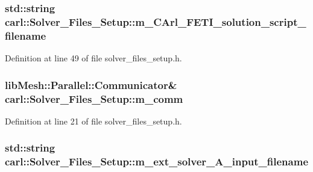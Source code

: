 \subsubsection[{m\+\_\+\+C\+Arl\+\_\+\+F\+E\+T\+I\+\_\+solution\+\_\+script\+\_\+filename}]{\setlength{\rightskip}{0pt plus 5cm}std\+::string carl\+::\+Solver\+\_\+\+Files\+\_\+\+Setup\+::m\+\_\+\+C\+Arl\+\_\+\+F\+E\+T\+I\+\_\+solution\+\_\+script\+\_\+filename\hspace{0.3cm}{\ttfamily [protected]}}\label{classcarl_1_1_solver___files___setup_a147113a3a6de5fa59e4236adf08e16b2}


Definition at line 49 of file solver\+\_\+files\+\_\+setup.\+h.

\hypertarget{classcarl_1_1_solver___files___setup_aa8049195d5e383a0ca4295795e3f5751}{}
\subsubsection[{m\+\_\+comm}]{\setlength{\rightskip}{0pt plus 5cm}lib\+Mesh\+::\+Parallel\+::\+Communicator\& carl\+::\+Solver\+\_\+\+Files\+\_\+\+Setup\+::m\+\_\+comm\hspace{0.3cm}{\ttfamily [protected]}}\label{classcarl_1_1_solver___files___setup_aa8049195d5e383a0ca4295795e3f5751}


Definition at line 21 of file solver\+\_\+files\+\_\+setup.\+h.

\hypertarget{classcarl_1_1_solver___files___setup_ae236e05ce11d2249f91f5a52906149a7}{}
\subsubsection[{m\+\_\+ext\+\_\+solver\+\_\+\+A\+\_\+input\+\_\+filename}]{\setlength{\rightskip}{0pt plus 5cm}std\+::string carl\+::\+Solver\+\_\+\+Files\+\_\+\+Setup\+::m\+\_\+ext\+\_\+solver\+\_\+\+A\+\_\+input\+\_\+filename\hspace{0.3cm}{\ttfamily [protected]}}\label{classcarl_1_1_solver___files___setup_ae236e05ce11d2249f91f5a52906149a7}


